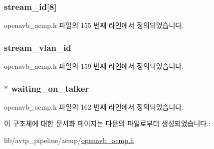 \subsubsection[{\texorpdfstring{stream\+\_\+id}{stream_id}}]{ stream\+\_\+id\mbox{[}8\mbox{]}}\hypertarget{structopenavb__acmp___talker_stream_info__t_a75d8c196686b96d97e0a271ac7b70da8}{}\label{structopenavb__acmp___talker_stream_info__t_a75d8c196686b96d97e0a271ac7b70da8}


openavb\+\_\+acmp.\+h 파일의 155 번째 라인에서 정의되었습니다.

\subsubsection[{\texorpdfstring{stream\+\_\+vlan\+\_\+id}{stream_vlan_id}}]{ stream\+\_\+vlan\+\_\+id}\hypertarget{structopenavb__acmp___talker_stream_info__t_a31db70d552fc6f5d35875430fca593e6}{}\label{structopenavb__acmp___talker_stream_info__t_a31db70d552fc6f5d35875430fca593e6}


openavb\+\_\+acmp.\+h 파일의 159 번째 라인에서 정의되었습니다.

\subsubsection[{\texorpdfstring{waiting\+\_\+on\+\_\+talker}{waiting_on_talker}}]{$\ast$ waiting\+\_\+on\+\_\+talker}\hypertarget{structopenavb__acmp___talker_stream_info__t_a1dff04a37b0f132bc0eff5d08b178fe3}{}\label{structopenavb__acmp___talker_stream_info__t_a1dff04a37b0f132bc0eff5d08b178fe3}


openavb\+\_\+acmp.\+h 파일의 162 번째 라인에서 정의되었습니다.



이 구조체에 대한 문서화 페이지는 다음의 파일로부터 생성되었습니다.\+:\begin{DoxyCompactItemize}
\item 
lib/avtp\+\_\+pipeline/acmp/\hyperlink{openavb__acmp_8h}{openavb\+\_\+acmp.\+h}\end{DoxyCompactItemize}

